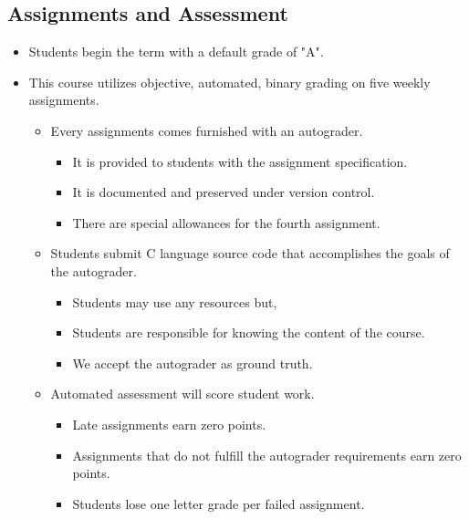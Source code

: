 \documentclass[11pt]{article}
\begin{document}

\subsection*{Assignments and Assessment}

\begin{itemize}
    \item Students begin the term with a default grade of "A".
    \item This course utilizes objective, automated, binary grading on five weekly assignments.
        \begin{itemize}
            \item  Every assignments comes furnished with an autograder.
            \begin{itemize}
                \item  It is provided to students with the assignment specification.
                \item  It is documented and preserved under version control.
                \item There are special allowances for the fourth assignment.
            \end{itemize}
            \item  Students submit C language source code that accomplishes the goals of the autograder.
            \begin{itemize}
                \item  Students may use any resources but,
                \item  Students are responsible for knowing the content of the course.
                \item  We accept the autograder as ground truth.
            \end{itemize}
            \item  Automated assessment will score student work.
            \begin{itemize}
                \item  Late assignments earn zero points.
                \item  Assignments that do not fulfill the autograder requirements earn zero points.
                \item  Students lose one letter grade per failed assignment.
            \end{itemize}
        \end{itemize}
\end{itemize}
\end{document}
